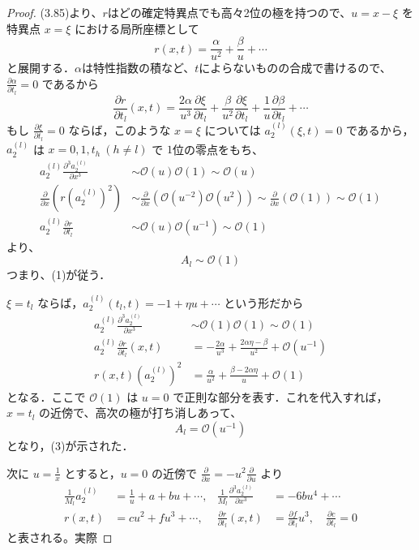 \documentclass[paper=a4, fontsize=11pt]{jlreq} %
\newenvironment{story}{%
  \begin{mdframed}[
    backgroundcolor=red!5, %
    linewidth=0pt,         %
    innertopmargin=10pt,   %
    innerbottommargin=10pt,
    innerrightmargin=10pt, %
    innerleftmargin=10pt
  ]%
}{%
  \end{mdframed}%
}
\theoremstyle{break}
\theoremstyle{qa}
\begin{document}
\begin{story}
\begin{proof}
(3.85)より、$r$はどの確定特異点でも高々2位の極を持つので、$u=x-\xi$ を特異点 $x=\xi$ における局所座標として
\[
    r(x,t) = \frac{\alpha}{u^2} + \frac{\beta}{u} + \cdots
\]
と展開する．$\alpha$は特性指数の積など、$t$によらないものの合成で書けるので、$\frac{\partial \alpha}{\partial t_l}=0$ であるから
\[
    \frac{\partial r}{\partial t_l}(x,t) = \frac{2\alpha}{u^3}\frac{\partial \xi}{\partial t_l} + \frac{\beta}{u^2}\frac{\partial \xi}{\partial t_l} + \frac{1}{u}\frac{\partial \beta}{\partial t_l}+\cdots
\]
もし $\frac{\partial \xi}{\partial t_l}=0$ ならば，このような $x=\xi$ については $a_2^{(l)}(\xi,t)=0$ であるから，
$a_2^{(l)}$ は $x = 0, 1, t_h \ (h \neq l)$ で $1$位の零点をもち、
\begin{align*}
    a_2^{(l)} \frac{\partial^3 a_2^{(l)}}{\partial x^3} &\sim \mathcal{O}(u) \mathcal{O}(1) \sim \mathcal{O}(u) \\[8pt]
    \frac{\partial}{\partial x} \left( r (a_2^{(l)})^2 \right) &\sim \frac{\partial}{\partial x} \left( \mathcal{O}(u^{-2}) \mathcal{O}(u^2) \right) \sim \frac{\partial}{\partial x} (\mathcal{O}(1)) \sim \mathcal{O}(1) \\[8pt]
    a_2^{(l)} \frac{\partial r}{\partial t_l} &\sim \mathcal{O}(u) \mathcal{O}(u^{-1}) \sim \mathcal{O}(1)
\end{align*}
より、
\begin{equation*}
    A_l \sim \mathcal{O}(1)
\end{equation*}
つまり、(1)が従う．

$\xi=t_l$ ならば，$a_2^{(l)}(t_l,t)=-1+\eta u+\cdots$ という形だから
\begin{align*}
    a_2^{(l)} \frac{\partial^3 a_2^{(l)}}{\partial x^3} &\sim \mathcal{O}(1) \mathcal{O}(1) \sim \mathcal{O}(1) \\
    a_2^{(l)} \frac{\partial r}{\partial t_l}(x,t) &= -\frac{2\alpha}{u^3} + \frac{2\alpha\eta-\beta}{u^2} + \mathcal{O}(u^{-1}) \\
    r(x,t)\left(a_2^{(l)}\right)^2 &= \frac{\alpha}{u^2} + \frac{\beta-2\alpha\eta}{u} + \mathcal{O}(1)
\end{align*}
となる．ここで $\mathcal{O}(1)$ は $u=0$ で正則な部分を表す．これを代入すれば，$x=t_l$ の近傍で、高次の極が打ち消しあって、
\[
    A_l = \mathcal{O}(u^{-1})
\]
となり，(3)が示された．

次に $u=\frac{1}{x}$ とすると，$u=0$ の近傍で $\frac{\partial}{\partial x}=-u^2 \frac{\partial}{\partial u}$ より
\begin{align*}
    \frac{1}{M_l}a_2^{(l)} &= \frac{1}{u}+a+bu+\cdots, & \frac{1}{M_l}\frac{\partial^3 a_2^{(l)}}{\partial x^3} &= -6bu^4+\cdots \\
    r(x,t) &= cu^2+fu^3+\cdots, & \frac{\partial r}{\partial t_l}(x,t) &= \frac{\partial f}{\partial t_l}u^3, \quad \frac{\partial c}{\partial t_l}=0
\end{align*}
と表される。実際


\end{proof}
\end{story}
\end{document}
